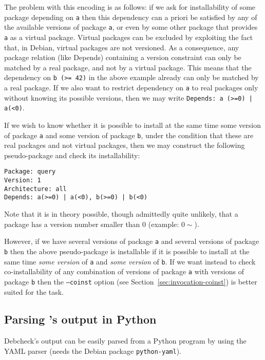 The problem with this encoding is as follows: if we ask \debcheck{}
for installability of some package depending on \texttt{a} then this
dependency can a priori be satisfied by any of the available versions
of package \texttt{a}, or even by some other package that provides
\texttt{a} as a virtual package. Virtual packages can be excluded by
exploiting the fact that, in Debian, virtual packages are not
versioned. As a consequence, any package relation (like Depends)
containing a version constraint can only be matched by a real package,
and not by a virtual package. This means that the dependency on
\texttt{b (>= 42)} in the above example already can only be matched by
a real package. If we also want to restrict dependency on \texttt{a}
to real packages only without knowing its possible versions, then we
may write \texttt{Depends: a (>=0) | a(<0)}.

\begin{example}
  If we wish to know whether it is possible to install at the same
  time some version of package \texttt{a} and some version of package
  \texttt{b}, under the condition that these are real packages and not
  virtual packages, then we may construct the following pseudo-package
  and check its installability:
\begin{verbatim}
Package: query
Version: 1
Architecture: all
Depends: a(>=0) | a(<0), b(>=0) | b(<0)
\end{verbatim}
\end{example}

Note that it is in theory possible, though admittedly quite unlikely,
that a package has a version number smaller than $0$ (example:
$0\sim$).

However, if we have several versions of package \texttt{a} and several
versions of package \texttt{b} then the above pseudo-package is
installable if it is possible to install at the same time \emph{some
  version} of \texttt{a} and \emph{some version} of \texttt{b}. If we
want instead to check co-installability of any combination of versions
of package \texttt{a} with versions of package \texttt{b} then the
\texttt{--coinst} option (see Section~\ref{sec:invocation-coinst}) is
better suited for the task.

\subsection{Parsing \debcheck's output in Python}
\label{sec:tricks-python}
Debcheck's output can be easily parsed from a Python program by using
the YAML parser (needs the Debian package \texttt{python-yaml}).

